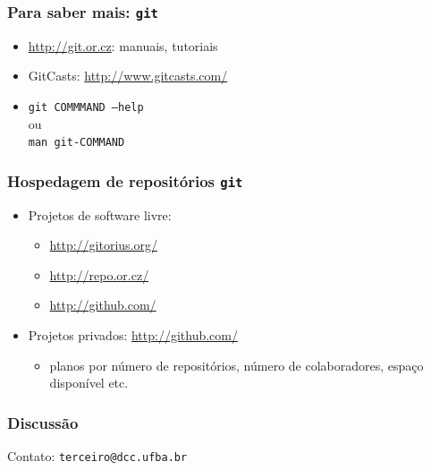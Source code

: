 \documentclass{beamer}
\newcommand{\git}{\texttt{git}}
\begin{document}
\begin{frame}
  \frametitle{Para saber mais: \git}
  \begin{itemize}
    \item \url{http://git.or.cz}: manuais, tutoriais
    \item GitCasts: \url{http://www.gitcasts.com/}
    \item \texttt{git COMMMAND --help}\\
      ou\\
      \texttt{man git-COMMAND}
  \end{itemize}
\end{frame}

\begin{frame}
  \frametitle{Hospedagem de repositórios \git}
  \begin{itemize}
    \item Projetos de software livre:
      \begin{itemize}
        \item \url{http://gitorius.org/}
        \item \url{http://repo.or.cz/}
        \item \url{http://github.com/}
      \end{itemize}

    \item Projetos privados: \url{http://github.com/}
      \begin{itemize}
        \item planos por número de repositórios, número de
          colaboradores, espaço disponível etc.
      \end{itemize}
  \end{itemize}
\end{frame}

\begin{frame}
  \frametitle{Discussão}
  \begin{center}
    Contato: \texttt{terceiro@dcc.ufba.br}
  \end{center}
\end{frame}
\end{document}
